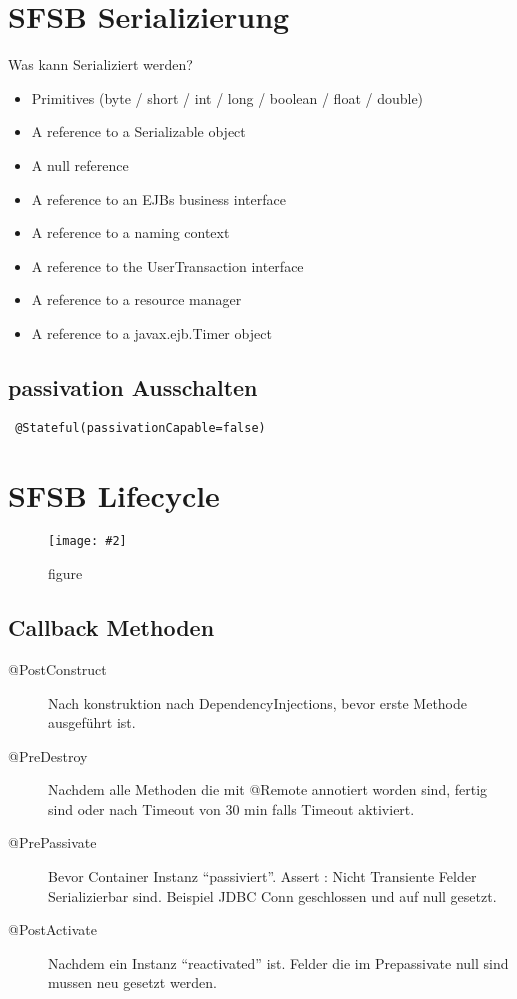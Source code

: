 \documentclass[a4paper,10pt]{scrreprt}
\newcommand{\pic}[2][figure]{\begin{figure}[h]
 \centering
 \texttt{[image: \#2]}
 \caption{#1}
\end{figure}
}
\begin{document}
\section{SFSB Serializierung}
Was kann Serializiert werden?
\begin{itemize}
 \item Primitives (byte / short / int / long / boolean / float / double)
\item A reference to a Serializable object
\item A null reference
\item A reference to an EJBs business interface
\item A reference to a naming context
\item A reference to the UserTransaction interface
\item A reference to a resource manager
\item A reference to a javax.ejb.Timer object
\end{itemize}

\subsection{passivation Ausschalten}
\begin{verbatim}
 @Stateful(passivationCapable=false)
\end{verbatim}

\section{SFSB Lifecycle}
\pic{sfsbl.png}

\subsection{Callback Methoden}
\begin{description}
 \item [@PostConstruct] Nach konstruktion nach DependencyInjections, bevor erste Methode ausgeführt ist.
 \item [@PreDestroy] Nachdem alle Methoden die mit @Remote annotiert worden sind, fertig sind oder nach Timeout von 30 
min falls Timeout aktiviert.
\item [@PrePassivate] Bevor Container Instanz ``passiviert''. Assert : Nicht Transiente Felder Serializierbar sind. 
Beispiel JDBC Conn geschlossen und auf null gesetzt.
\item[@PostActivate] Nachdem ein Instanz ``reactivated'' ist. Felder die im Prepassivate null sind mussen neu gesetzt 
werden.

\end{description}
\end{document}
